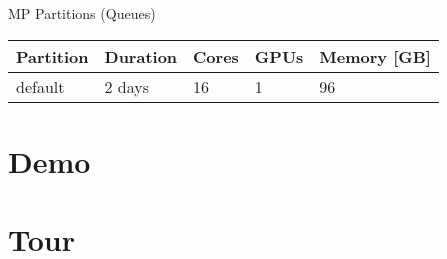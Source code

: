 \begin{frame}{MP Partitions (Queues)}
\begin{table}
\scriptsize
\begin{tabular}{lllll}
\toprule
Partition & Duration & Cores & GPUs & Memory [GB]\\
\midrule
default & 2 days & 16 & 1 & 96\\
\bottomrule
\end{tabular}
\end{table}
\end{frame}


\section{Demo}

\section{Tour}


